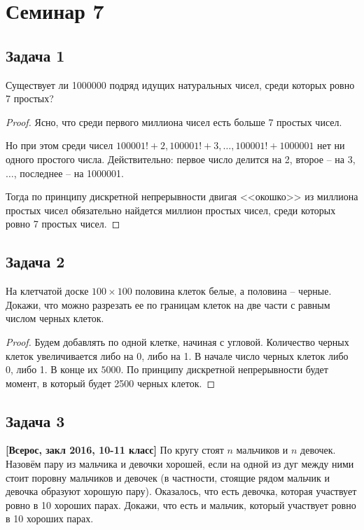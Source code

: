 
\section{Семинар 7}

\subsection{Задача 1}
Существует ли 1000000 подряд идущих натуральных чисел, среди которых ровно 7
простых?

\begin{proof}
Ясно, что среди первого миллиона чисел есть больше 7 простых чисел.

Но при этом среди чисел $100001! + 2, 100001! + 3, \ldots, 100001! + 1000001$ нет ни одного простого числа. Действительно: первое число делится на 2, второе -- на 3, $\ldots$, последнее -- на 1000001.

Тогда по принципу дискретной непрерывности двигая <<окошко>> из миллиона простых чисел обязательно найдется миллион простых чисел, среди которых ровно 7 простых чисел.
\end{proof}

\subsection{Задача 2}
На клетчатой доске $100 \times 100$ половина клеток белые, а половина -- черные. Докажи,
что можно разрезать ее по границам клеток на две части с равным числом черных
клеток.

\begin{proof}
Будем добавлять по одной клетке, начиная с угловой. Количество черных клеток увеличивается либо на 0, либо на 1. В начале число черных клеток либо 0, либо 1. В конце их $5000$. По принципу дискретной непрерывности будет момент, в который будет 2500 черных клеток. 
\end{proof}

\subsection{Задача 3}
\textbf{[Всерос, закл 2016, 10-11 класс]} По кругу стоят $n$ мальчиков и $n$ девочек. Назовём пару из мальчика и девочки хорошей, если на одной из дуг между ними стоит поровну мальчиков и девочек (в частности, стоящие рядом мальчик и девочка образуют хорошую пару). Оказалось, что есть
девочка, которая участвует ровно в 10 хороших парах. Докажи, что есть и мальчик,
который участвует ровно в 10 хороших парах.

